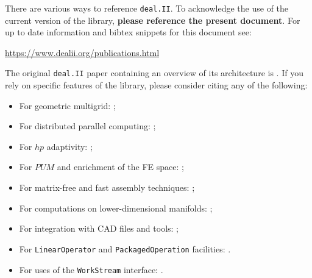 \documentclass{ansarticle-preprint}
\newcommand{\specialword}[1]{\texttt{#1}}
\newcommand{\dealii}{{\specialword{deal.II}}}
\begin{document}
There are various ways to reference \dealii{}. To acknowledge the use of
the current version of the library, \textbf{please reference the present
document}. For up to date information and bibtex snippets for this document
see:
\begin{center}
 \url{https://www.dealii.org/publications.html}
\end{center}

The original \texttt{\dealii{}} paper containing an overview of its
architecture is \cite{BangerthHartmannKanschat2007}. If you rely on
specific features of the library, please consider citing any of the
following:
\begin{itemize}
 \item For geometric multigrid: \cite{Kanschat2004,JanssenKanschat2011};
 \item For distributed parallel computing: \cite{BangerthBursteddeHeisterKronbichler11};
 \item For $hp$ adaptivity: \cite{BangerthKayserHerold2007};
  \item For $PUM$ and enrichment of the FE space: \cite{Davydov2016};
 \item For matrix-free and fast assembly techniques:
   \cite{KronbichlerKormann2012};
 \item For computations on lower-dimensional manifolds:
   \cite{DeSimoneHeltaiManigrasso2009};
 \item For integration with CAD files and tools:
   \cite{HeltaiMola2015};
 \item For \texttt{LinearOperator} and \texttt{PackagedOperation} facilities:
   \cite{MaierBardelloniHeltai-2016-a,MaierBardelloniHeltai-2016-b}.
 \item For uses of the \texttt{WorkStream} interface:
   \cite{TKB16}.
\end{itemize}
\end{document}
